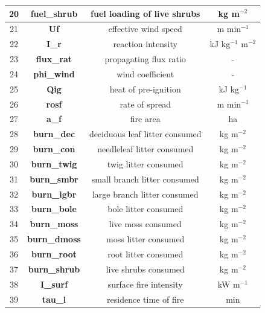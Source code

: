 \documentclass[a4paper, 12pt] {article}
\begin{document}
\begin{table} [H]
{\begin{tabular}{|c|c|c|c|}
			\hline 
			20 & \textbf{fuel\_shrub} & fuel loading of live shrubs &  kg m$^{-2}$  \\
	        \hline
	        21 & \textbf{Uf} & effective wind speed &  m min$^{-1}$  \\
	        \hline
	        22 & \textbf{I\_r} & reaction intensity &  kJ kg$^{-1}$ m$^{-2}$  \\
	        \hline
	        23 & \textbf{flux\_rat} & propagating flux ratio &  -  \\
	        \hline
	        24 & \textbf{phi\_wind} & wind coefficient &  -  \\
	        \hline
	        25 & \textbf{Qig} & heat of pre-ignition &  kJ kg$^{-1}$  \\
	        \hline
	        26 & \textbf{rosf} & rate of spread &  m min$^{-1}$  \\
	        \hline
	        27 & \textbf{a\_f} & fire area &  ha \\
	        \hline
	        28 & \textbf{burn\_dec} & deciduous leaf litter consumed  & kg m$^{-2}$   \\
	        \hline 
	        29 & \textbf{burn\_con} & needleleaf litter consumed  & kg m$^{-2}$   \\
	        \hline 
	        30 & \textbf{burn\_twig} & twig litter consumed  & kg m$^{-2}$   \\
	        \hline 
	        31 & \textbf{burn\_smbr} & small branch litter consumed  & kg m$^{-2}$   \\
	        \hline 
	        32 & \textbf{burn\_lgbr} & large branch litter consumed  & kg m$^{-2}$   \\
	        \hline 
	        33 & \textbf{burn\_bole} & bole litter consumed & kg m$^{-2}$   \\
	        \hline 
	        34 & \textbf{burn\_moss} & live moss consumed & kg m$^{-2}$   \\
	        \hline 
	        35 & \textbf{burn\_dmoss} & moss litter consumed & kg m$^{-2}$   \\
	        \hline 
	        36 & \textbf{burn\_root} & root litter consumed & kg m$^{-2}$   \\
	        \hline 
	        37 & \textbf{burn\_shrub} & live shrubs consumed &  kg m$^{-2}$  \\
	        \hline 
	        38 & \textbf{I\_surf} & surface fire intensity &  kW m$^{-1}$  \\
	         \hline 
	        39 & \textbf{tau\_l} & residence time of fire & min  \\
	        \hline
	\end{tabular}}
\end{table}
\end{document}
